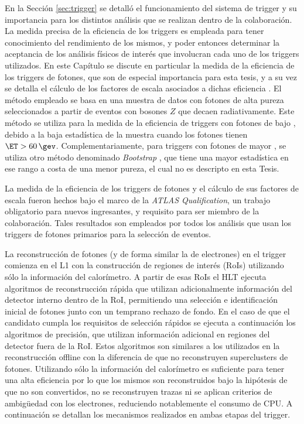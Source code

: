 En la Sección \ref{sec:trigger} se detalló el funcionamiento del sistema de trigger y su importancia para los distintos análisis que se realizan dentro de la colaboración. La medida precisa de la eficiencia de los triggers es empleada para tener conocimiento del rendimiento de los mismos, y poder entonces determinar la aceptancia de los análisis físicos de interés que involucran cada uno de los triggers utilizados. 
En este Capítulo se discute en particular la medida de la eficiencia de los triggers de fotones, que son de especial importancia para esta tesis, y a su vez se detalla el cálculo de los factores de escala asociados a dichas eficiencia . El método empleado se basa en una muestra de datos con fotones de alta pureza seleccionados a partir de eventos con bosones $Z$ que decaen radiativamente. Este método se utiliza para la medida de la eficiencia de triggers con fotones de bajo \ET, debido a la baja estadística de la muestra cuando los fotones tienen $\ET>60\,\gev$. Complementariamente, para triggers con fotones de mayor \ET, se utiliza otro método denominado \textit{Bootstrap} \cite{tesis_joaco}, que tiene una mayor estadística en ese rango a costa de una menor pureza, el cual no es descripto en esta Tesis.

La medida de la eficiencia de los triggers de fotones y el cálculo de sus factores de escala fueron hechos bajo el marco de la \textit{ATLAS Qualification}, un trabajo obligatorio para nuevos ingresantes, y requisito para ser miembro de la colaboración. Tales resultados son empleados por todos los análisis que usan los triggers de fotones primarios para la selección de eventos.



La reconstrucción de fotones \cite{TRIG-2018-05} (y de forma similar la de electrones) en el trigger comienza en el L1 con la construcción de regiones de interés (RoIs) utilizando sólo la información del calorímetro. A partir de esas RoIs el HLT ejecuta algoritmos de reconstrucción rápida que utilizan adicionalmente información del detector interno dentro de la RoI, permitiendo una selección e identificación inicial de fotones junto con un temprano rechazo de fondo. En el caso de que el candidato cumpla los requisitos de selección rápidos se ejecuta a continuación los algoritmos de precisión, que utilizan información adicional en regiones del detector fuera de la RoI. Estos algoritmos son similares a los utilizados en la reconstrucción offline con la diferencia de que no reconstruyen superclusters de fotones. Utilizando sólo la información del calorímetro es suficiente para tener una alta eficiencia por lo que los mismos son reconstruidos bajo la hipótesis de que no son convertidos, no se reconstruyen trazas ni se aplican criterios de ambigüedad con los electrones, reduciendo notablemente el consumo de CPU. 
A continuación se detallan los mecanismos realizados en ambas etapas del trigger.



